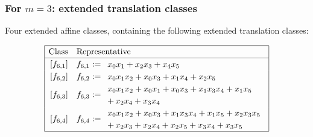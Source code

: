 \documentclass[pdf,sprung,slideColor,nocolorBG]{beamer}
\begin{document}
\begin{frame}
\frametitle{For $m=3$: extended translation classes}

Four extended affine classes, containing the following extended translation classes:

\begin{align*}
\def\arraystretch{1.2}
\begin{array}{|cl|}
\hline
\text{Class} &
\text{Representative}
\\
\hline
\,[f_{6,1}] & f_{6,1} := 
\begin{array}{l}
x_{0} x_{1} + x_{2} x_{3} + x_{4} x_{5}
\end{array}
\\
\,[f_{6,2}] & f_{6,2} := 
\begin{array}{l}
x_{0} x_{1} x_{2} + x_{0} x_{3} + x_{1} x_{4} + x_{2} x_{5}
\end{array}
\\
\,[f_{6,3}] & f_{6,3} := 
\begin{array}{l}
x_{0} x_{1} x_{2} + x_{0} x_{1} + x_{0} x_{3} + x_{1} x_{3} x_{4} + x_{1} x_{5}
\\
 +\, x_{2} x_{4} + x_{3} x_{4}
\end{array}
\\
\,[f_{6,4}] & f_{6,4} := 
\begin{array}{l}
x_{0} x_{1} x_{2} + x_{0} x_{3} + x_{1} x_{3} x_{4} + x_{1} x_{5} + x_{2} x_{3} x_{5}
\\
 +\, x_{2} x_{3} + x_{2} x_{4} + x_{2} x_{5} + x_{3} x_{4} + x_{3} x_{5}
\end{array}
\\
\hline
\end{array}
\end{align*}
\end{frame}
% 
% 
% 
\end{document}
